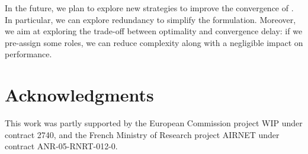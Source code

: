 \documentclass[twoside]{article}
\begin{document}
In the future, we plan to explore new strategies to improve the
convergence of \potatoes. In particular, we can explore redundancy to
simplify the \milp formulation. Moreover, we aim at exploring the
trade-off between optimality and convergence delay: if we pre-assign
some roles, we can reduce complexity along with a negligible impact on
performance.


\section*{Acknowledgments}
This work was partly supported by the European Commission project WIP under contract 2740, and the French Ministry of Research project AIRNET under contract ANR-05-RNRT-012-0.




\end{document}
